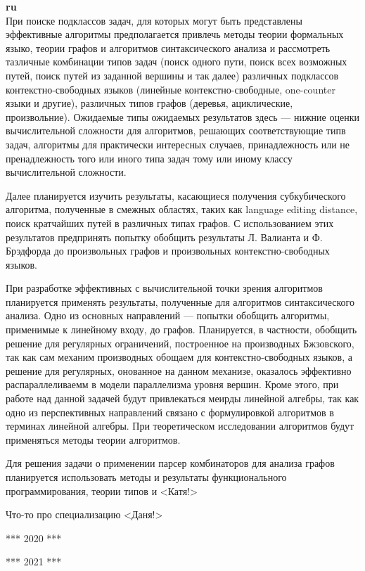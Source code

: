 \documentclass[12pt]{article}  %
\theoremstyle{remark}
\begin{document}
\textbf{ru}\\
При поиске подклассов задач, для которых могут быть представлены эффективные алгоритмы предполагается привлечь методы теории формальных языко, теории графов и алгоритмов синтаксического анализа и рассмотреть тазличные комбинации типов задач (поиск одного пути, поиск всех возможных путей, поиск путей из заданной вершины и так далее) различных подклассов контекстно-свободных языков (линейные контекстно-свободные, one-counter языки и другие), различных типов графов (деревья, ациклические, произвольние). Ожидаемые типы ожидаемых результатов здесь --- нижние оценки вычислительной сложности для алгоритмов, решающих соответствующие типв задач, алгоритмы для практически интересных случаев, принадлежность или не пренадлежность того или иного типа задач тому или иному классу вычислительной сложности.

Далее планируется изучить результаты, касающиеся получения субкубического алгоритма, полученные в смежных областях, таких как language editing distance, поиск кратчайших путей в различных типах графов. С использованием этих результатов предпринять попытку обобщить результаты Л. Валианта и Ф. Брэдфорда до произвольных графов и произвольных контекстно-свободных языков.

При разработке эффективных с вычислительной точки зрения алгоритмов планируется применять результаты, полученные для алгоритмов синтаксического анализа. Одно из основных направлений --- попытки обобщить алгоритмы, применимые к линейному входу, до графов. Планируется, в частности, обобщить решение для регулярных ограничений, построенное на производных Бжзовского, так как сам механим производных обощаем для контекстно-свободных языков, а решение для регулярных, онованное на данном механизе, оказалось эффективно распараллеливаемм в модели параллелизма уровня вершин. Кроме этого, при работе над данной задачей будут привлекаться меирды линейной алгебры, так как одно из перспективных направлений связано с формулировкой алгоритмов в терминах линейной алгебры. При теоретическом исследовании алгоритмов будут применяться методы теории алгоритмов.

Для решения задачи о применении парсер комбинаторов для анализа графов планируется использовать методы и результаты функционального программирования, теории типов и {\huge<Катя!>}

Что-то про специализацию {\huge<Даня!>}

*** 2020 ***

*** 2021 ***
\end{document}
